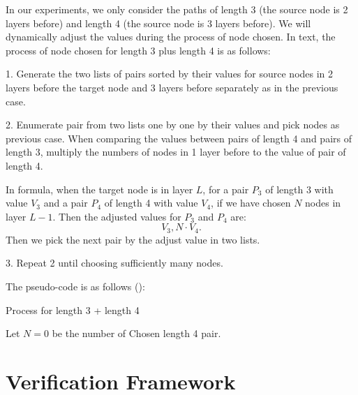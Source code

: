 \documentclass{llncs}
\begin{document}
In our experiments, we only consider the paths of length 3 (the source node is 2 layers before) and length 4 (the source node is 3 layers before). We will dynamically adjust the values during the process of node chosen. In text, the process of node chosen for length 3 plus length 4 is as follows:

\vspace*{1ex}

1. Generate the two lists of pairs sorted by their values for source nodes in 2 layers before the target node and 3 layers before separately as in the previous case.

2. Enumerate pair from two lists one by one by their values and pick nodes as previous case. When comparing the values between pairs of length 4 and pairs of length 3, multiply the numbers of nodes in 1 layer before to the value of pair of length 4.

In formula, when the target node is in layer $L$, for a pair $P_3$ of length 3 with value $V_3$ and a pair $P_4$ of length 4 with value $V_4$, if we have chosen $N$ nodes in layer $L-1$. Then the adjusted values for $P_3$ and $P_4$ are: $$V_3, N\cdot V_4.$$ Then we pick the next pair by the adjust value in two lists.

3. Repeat 2 until choosing sufficiently many nodes.

\vspace*{1ex}

The pseudo-code is as follows ():

\begin{algorithm}
	\caption{Process for length 3 + length 4}
	
	Let $N = 0$ be the number of Chosen length 4 pair.
	
\end{algorithm}


\section{Verification Framework}
\end{document}
